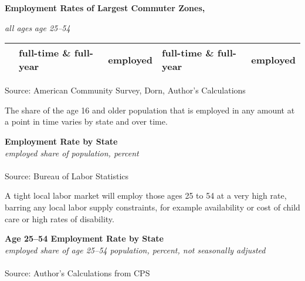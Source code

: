 \documentclass{report}
\begin{document}
{\begin{minipage}{0.24\textwidth}
\footnotesize 
\end{minipage}
\newpage
\begin{minipage}{0.76\textwidth} 
\normalsize \textbf{Employment Rates of Largest Commuter Zones, }
\vspace{-1mm}

\footnotesize \hspace{42mm} \textit{all ages} \hspace{20mm} \textit{age 25--54}\\
 \setlength{\tabcolsep}{3.1pt} \color{black!90}
	{\renewcommand{\arraystretch}{1.55}
		\begin{tabular}{p{24mm} R{15mm} R{15mm} R{15mm} R{15mm}}
		 	& full-time \& full-year & employed & full-time \& full-year & employed \\
			  \hline
		\end{tabular}}	
\vspace{-2mm}

\footnotesize{Source: American Community Survey, Dorn, Author's Calculations}
\vspace{6mm}

\small The share of the age 16 and older population that is employed in any amount at a point in time varies by state and over time. 
\end{minipage}
\vspace{2mm}

\normalsize \textbf{Employment Rate by State}\\
\footnotesize{\textit{employed share of population, percent}}\\
\vspace{-2mm}
\hspace{-8mm}  \\
\footnotesize{Source: Bureau of Labor Statistics}
\newpage
\begin{minipage}{0.76\textwidth} 
\small A tight local labor market will employ those ages 25 to 54 at a very high rate, barring any local labor supply constraints, for example availability or cost of child care or high rates of disability. 


\end{minipage}

\normalsize \textbf{Age 25--54 Employment Rate by State}\\
\footnotesize{\textit{employed share of age 25--54 population, percent, not seasonally adjusted}}\\
\vspace{-3mm}
\hspace{-9mm}  \\
\footnotesize{Source: Author's Calculations from CPS}
\vspace{2mm}

}
\end{document}
